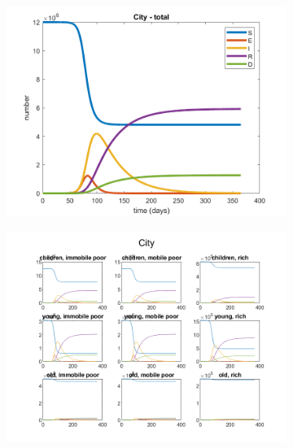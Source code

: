 \documentclass{article}
\begin{document}
\begin{figure}[H]
	\centering
	\begin{subfigure}[b]{0.5\textwidth}
		\includegraphics[width=\textwidth]{no-economic-effect/no-mitigation/City-total}
	\end{subfigure}%
	\begin{subfigure}[b]{0.5\textwidth}
		\includegraphics[width=\textwidth]{no-economic-effect/no-mitigation/City-all-cat}
	\end{subfigure}


\end{figure}
\end{document}
